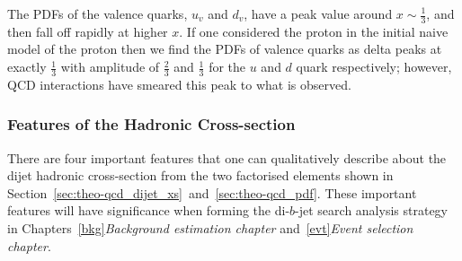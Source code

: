 The PDFs of the valence quarks, $u_v$ and $d_v$, have a peak value around $x \sim \frac{1}{3}$, and then fall off rapidly at higher $x$.
If one considered the proton in the initial naive model of the proton then we find the PDFs of valence quarks as delta peaks at exactly $\frac{1}{3}$
with amplitude of $\frac{2}{3}$ and $\frac{1}{3}$ for the $u$ and $d$ quark respectively;
however, QCD interactions have smeared this peak to what is observed.

\subsubsection{Features of the Hadronic Cross-section}
\label{sec:theo-qcd-dijet_features}

There are four important features that one can qualitatively describe about the dijet hadronic cross-section
from the two factorised elements shown in Section~\ref{sec:theo-qcd_dijet_xs}~and~\ref{sec:theo-qcd_pdf}.
These important features will have significance when forming the di-$b$-jet search analysis strategy in
Chapters~\ref{bkg}\textit{Background estimation chapter} and~\ref{evt}\textit{Event selection chapter}.


